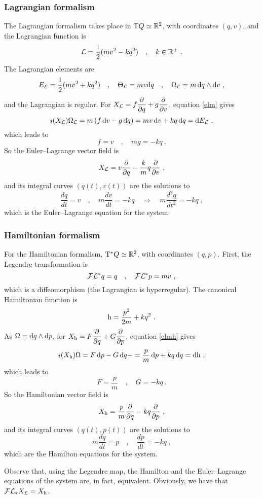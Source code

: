 \documentclass[12pt]{report}
\def\derpar#1#2{\frac{\partial{#1}}{\partial{#2}}}
\def\Lag{{\cal L}}
\def\d{{\rm d}}
\def\Real{\mathbb{R}}
\def\Tan{{\rm T}}
\def\inn{\mathop{i}\nolimits}
\def\Leg{{\cal F}\Lag}
\begin{document}
\subsubsection{Lagrangian formalism}


The Lagrangian formalism takes place in $\Tan Q\simeq\Real^2$, with coordinates 
$(q,v)$, and the Lagrangian function is 
$$
\Lag=\frac{1}{2}(mv^2-kq^2) \quad , \quad k\in\Real^+ \ .
$$
The Lagrangian elements are
$$
E_\Lag=\frac{1}{2}(mv^2+kq^2) \quad , \quad
\Theta_\Lag=mv\d q \quad , \quad
\Omega_\Lag = m\,\d q\wedge\d v \ ,
$$
and the Lagrangian is regular.
For $\displaystyle X_\Lag=f\derpar{}{q}+g\derpar{}{v}$, equation \eqref{elm} gives
$$
\inn(X_\Lag)\Omega_\Lag=
m\,(f\, \d v-g\, \d q)=
mv\, \d v+kq\, \d q=\d E_\Lag\ ,
$$
which leads to
$$
f=v \quad , \quad mg=-kq \ .
$$
So the Euler--Lagrange vector field is
$$
X_\Lag=v\derpar{}{q}-\frac{k}{m}q\derpar{}{v} \ ,
$$
and its integral curves $(q(t),v(t))$ are the solutions to
$$
\frac{dq}{dt} =v \quad , \quad m\frac{dv}{dt}=-kq
\quad \Longrightarrow \quad m\frac{d^2q}{dt^2}=-kq  \ ,
$$
which is the Euler--Lagrange equation for the system.

\subsubsection{Hamiltonian formalism}

For the Hamiltonian formalism, $\Tan^*Q\simeq\Real^2$,
with coordinates $(q,p)$. First, the Legendre transformation is
$$
\Leg^*q=q  \quad , \quad \Leg^*p=mv  \ ,
$$
which is a diffeomorphism (the Lagrangian is hyperregular).
The canonical Hamiltonian function is
$$
{\rm h}=\frac{p^2}{2m}+kq^2 \ .
$$
As $\Omega=\d q\wedge\d p$,
for $\displaystyle X_{\rm h}=F\derpar{}{q}+G\derpar{}{p}$,
equation \eqref{elmh} gives
$$
\inn(X_{\rm h})\Omega= F\, \d p-G\, \d q-=
\frac{p}{m}\, \d p+kq\, \d q=\d{\rm h}\ ,
$$
which leads to
$$
F=\frac{p}{m} \quad , \quad G=-kq  \ .
$$
So the Hamiltonian vector field is
$$
X_{\rm h}=\frac{p}{m}\derpar{}{q}-kq\derpar{}{p} \ ,
$$
and its integral curves $(q(t),p(t))$ are the solutions to
$$
m\frac{dq}{dt} =p \quad , \quad
\frac{dp}{dt}=-kq \ ,
$$
which are the Hamilton equations for the system.

Observe that, using the Legendre map, the Hamilton and
the Euler--Lagrange equations of the system are, in fact, equivalent.
Obviously, we have that $\Leg_*X_\Lag=X_{\rm h}$.

\end{document}
